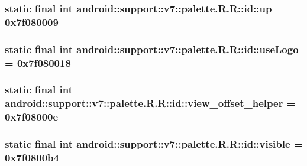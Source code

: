 \hypertarget{classandroid_1_1support_1_1v7_1_1palette_1_1_r_1_1id_58123eef37d2f6423ac623072f1ca76d}{
\subsubsection[{up}]{\setlength{\rightskip}{0pt plus 5cm}static final int android::support::v7::palette.R.R::id::up = 0x7f080009}}
\label{classandroid_1_1support_1_1v7_1_1palette_1_1_r_1_1id_58123eef37d2f6423ac623072f1ca76d}


\hypertarget{classandroid_1_1support_1_1v7_1_1palette_1_1_r_1_1id_478eb97f6985694a0a9ca3b578d9fbc2}{
\subsubsection[{useLogo}]{\setlength{\rightskip}{0pt plus 5cm}static final int android::support::v7::palette.R.R::id::useLogo = 0x7f080018}}
\label{classandroid_1_1support_1_1v7_1_1palette_1_1_r_1_1id_478eb97f6985694a0a9ca3b578d9fbc2}


\hypertarget{classandroid_1_1support_1_1v7_1_1palette_1_1_r_1_1id_29016084f2569f69f0f829c80fd62bb7}{
\subsubsection[{view\_\-offset\_\-helper}]{\setlength{\rightskip}{0pt plus 5cm}static final int android::support::v7::palette.R.R::id::view\_\-offset\_\-helper = 0x7f08000e}}
\label{classandroid_1_1support_1_1v7_1_1palette_1_1_r_1_1id_29016084f2569f69f0f829c80fd62bb7}


\hypertarget{classandroid_1_1support_1_1v7_1_1palette_1_1_r_1_1id_8e8ad06ddd735a0f8ccfcdded71302aa}{
\subsubsection[{visible}]{\setlength{\rightskip}{0pt plus 5cm}static final int android::support::v7::palette.R.R::id::visible = 0x7f0800b4}}
\label{classandroid_1_1support_1_1v7_1_1palette_1_1_r_1_1id_8e8ad06ddd735a0f8ccfcdded71302aa}


